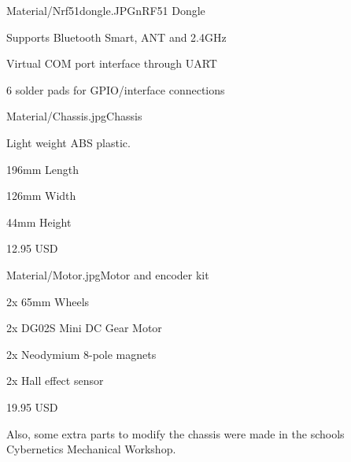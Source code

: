 \newpage
{}
\begin{material}{Material/Nrf51dongle.JPG}{nRF51 Dongle}
\item Supports Bluetooth Smart, ANT and 2.4GHz
\item Virtual COM port interface through UART
\item 6 solder pads for GPIO/interface connections
\end{material}

\begin{material}{Material/Chassis.jpg}{Chassis}
\item Light weight ABS plastic.
\item 196mm Length 
\item 126mm Width 
\item 44mm Height
\item 12.95 USD
\end{material}

\begin{material}{Material/Motor.jpg}{Motor and encoder kit}
\item 2x 65mm Wheels
\item 2x DG02S Mini DC Gear Motor
\item 2x Neodymium 8-pole magnets
\item 2x Hall effect sensor
\item 19.95 USD
\end{material}

Also, some extra parts to modify the chassis were made in the schools Cybernetics Mechanical Workshop.